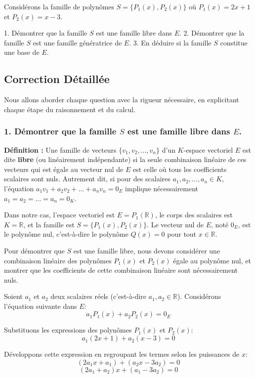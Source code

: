 \documentclass{report}
\begin{document}
Considérons la famille de polynômes $S = \{P_1(x), P_2(x)\}$ où $P_1(x) = 2x+1$ et $P_2(x) = x-3$.

1.  Démontrer que la famille $S$ est une famille libre dans $E$.
2.  Démontrer que la famille $S$ est une famille génératrice de $E$.
3.  En déduire si la famille $S$ constitue une base de $E$.

\subsection*{Correction Détaillée}

Nous allons aborder chaque question avec la rigueur nécessaire, en explicitant chaque étape du raisonnement et du calcul.

\subsubsection*{1. Démontrer que la famille $S$ est une famille libre dans $E$.}

\textbf{Définition :} Une famille de vecteurs $\{v_1, v_2, \ldots, v_n\}$ d'un $K$-espace vectoriel $E$ est dite \textbf{libre} (ou linéairement indépendante) si la seule combinaison linéaire de ces vecteurs qui est égale au vecteur nul de $E$ est celle où tous les coefficients scalaires sont nuls. Autrement dit, si pour des scalaires $a_1, a_2, \ldots, a_n \in K$, l'équation $a_1 v_1 + a_2 v_2 + \ldots + a_n v_n = 0_E$ implique nécessairement $a_1 = a_2 = \ldots = a_n = 0_K$.

Dans notre cas, l'espace vectoriel est $E = P_1(\mathbb{R})$, le corps des scalaires est $K = \mathbb{R}$, et la famille est $S = \{P_1(x), P_2(x)\}$. Le vecteur nul de $E$, noté $0_E$, est le polynôme nul, c'est-à-dire le polynôme $Q(x) = 0$ pour tout $x \in \mathbb{R}$.

Pour démontrer que $S$ est une famille libre, nous devons considérer une combinaison linéaire des polynômes $P_1(x)$ et $P_2(x)$ égale au polynôme nul, et montrer que les coefficients de cette combinaison linéaire sont nécessairement nuls.

Soient $a_1$ et $a_2$ deux scalaires réels (c'est-à-dire $a_1, a_2 \in \mathbb{R}$).
Considérons l'équation suivante dans $E$:
$$a_1 P_1(x) + a_2 P_2(x) = 0_E$$

Substituons les expressions des polynômes $P_1(x)$ et $P_2(x)$:
$$a_1 (2x+1) + a_2 (x-3) = 0$$

Développons cette expression en regroupant les termes selon les puissances de $x$:
$$(2a_1 x + a_1) + (a_2 x - 3a_2) = 0$$
$$(2a_1 + a_2)x + (a_1 - 3a_2) = 0$$
\end{document}
